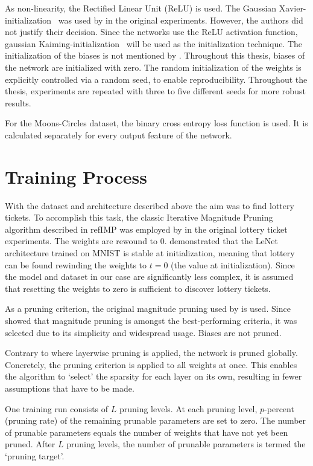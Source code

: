 As non-linearity, the Rectified Linear Unit (ReLU) is used.
The Gaussian Xavier-initialization~\textcite{XAVIER-GLOROT} was used by \textcite{LTH} in the original experiments.
However, the authors did not justify their decision.
Since the networks use the ReLU activation function, gaussian Kaiming-initialization~\autocite{KAIMING-HE} will be used as the initialization technique.
The initialization of the biases is not mentioned by \textcite{LTH}.
Throughout this thesis, biases of the network are initialized with zero.
The random initialization of the weights is explicitly controlled via a random seed, to enable reproducibility.
Throughout the thesis, experiments are repeated with three to five different seeds for more robust results.

For the Moons-Circles dataset, the binary cross entropy loss function is used.
It is calculated separately for every output feature of the network.

\section{Training Process}
With the dataset and architecture described above the aim was to find lottery tickets.
To accomplish this task, the classic Iterative Magnitude Pruning algorithm described in refIMP was employed by \textcite{LTH} in the original lottery ticket experiments.
The weights are rewound to $0$.
\textcite{LinearModeConnectivity} demonstrated that the LeNet architecture trained on MNIST is stable at initialization, meaning that lottery can be found rewinding the weights to $t=0$ (the value at initialization). 
Since the model and dataset in our case are significantly less complex, it is assumed that resetting the weights to zero is sufficient to discover lottery tickets.

As a pruning criterion, the original magnitude pruning used by \autocite{LTH} is used. 
Since \autocite{Supermasks} showed that magnitude pruning is amongst the best-performing criteria, it was selected due to its simplicity and widespread usage.
Biases are not pruned.

Contrary to \autocite{LTH} where layerwise pruning is applied, the network is pruned globally.
Concretely, the pruning criterion is applied to all weights at once.
This enables the algorithm to `select' the sparsity for each layer on its own, resulting in fewer assumptions that have to be made.

One training run consists of $L$ pruning levels. 
At each pruning level, $p$-percent (pruning rate) of the remaining prunable parameters are set to zero.
The number of prunable parameters equals the number of weights that have not yet been pruned.
After $L$ pruning levels, the number of prunable parameters is termed the `pruning target'.

